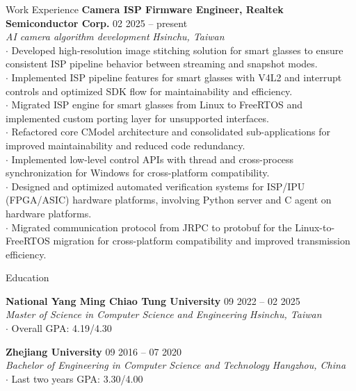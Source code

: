 \documentclass{resume}
\begin{document}
\vspace{-1em}
\begin{rSection}{Work Experience}
    {\bf Camera ISP Firmware Engineer, Realtek Semiconductor Corp.} \hfill {02 2025 -- present}\\
    {\textit{AI camera algorithm development}} \hfill \textit{Hsinchu, Taiwan}\\
    $\cdot$ Developed high-resolution image stitching solution for smart glasses to ensure consistent ISP pipeline behavior between streaming and snapshot modes.\\
    $\cdot$ Implemented ISP pipeline features for smart glasses with V4L2 and interrupt controls and optimized SDK flow for maintainability and efficiency.\\
    $\cdot$ Migrated ISP engine for smart glasses from Linux to FreeRTOS and implemented custom porting layer for unsupported interfaces.\\
    $\cdot$ Refactored core CModel architecture and consolidated sub-applications for improved maintainability and reduced code redundancy.\\
    $\cdot$ Implemented low-level control APIs with thread and cross-process synchronization for Windows for cross-platform compatibility.\\
    $\cdot$ Designed and optimized automated verification systems for ISP/IPU (FPGA/ASIC) hardware platforms, involving Python server and C agent on hardware platforms.\\
    $\cdot$ Migrated communication protocol from JRPC to protobuf for the Linux-to-FreeRTOS migration for cross-platform compatibility and improved transmission efficiency.
\end{rSection}

\vspace{-1em}
\begin{rSection}{Education}

{\bf National Yang Ming Chiao Tung University} \hfill {09 2022 -- 02 2025}\\
{\textit{Master of Science in Computer Science and Engineering}} \hfill \textit{Hsinchu, Taiwan}\\
$\cdot$ Overall GPA: 4.19/4.30

{\bf Zhejiang University} \hfill {09 2016 -- 07 2020}\\
{\textit{Bachelor of Engineering in Computer Science and Technology}} \hfill \textit{Hangzhou, China}\\
$\cdot$ Last two years GPA: 3.30/4.00

\end{rSection}
\end{document}
